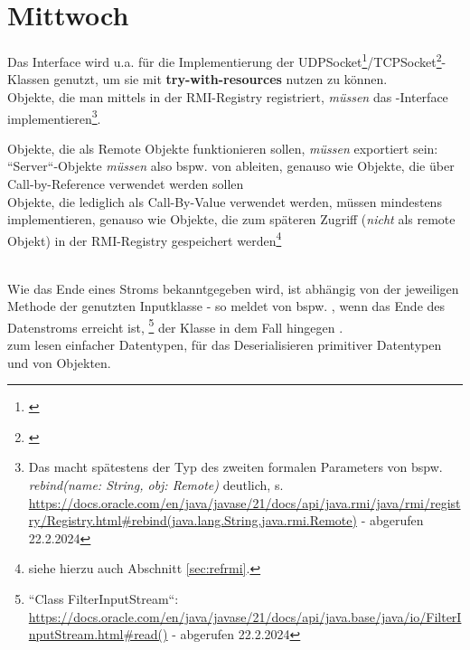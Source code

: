 \section{Mittwoch}

Das Interface  wird u.a. für die Implementierung der UDPSocket\footnote{\cite[269, Listing 5.1]{Oec22}}/TCPSocket\footnote{\cite[286, Listing 5.7]{Oec22}}-Klassen genutzt, um sie mit \textbf{try-with-resources} nutzen zu können.\\

\noindent
Objekte, die man mittels   in der RMI-Registry registriert, \textit{müssen} das -Interface implementieren\footnote{
Das macht spätestens der Typ des zweiten formalen Parameters von bspw. \textit{rebind(name: String, obj: Remote)} deutlich, s. \url{https://docs.oracle.com/en/java/javase/21/docs/api/java.rmi/java/rmi/registry/Registry.html#rebind(java.lang.String,java.rmi.Remote)} - abgerufen 22.2.2024
}.

\begin{tcolorbox}
Objekte, die als Remote Objekte funktionieren sollen, \textit{müssen} exportiert sein: ``Server``-Objekte \textit{müssen} also bspw. von  ableiten, genauso wie Objekte, die über Call-by-Reference verwendet werden sollen\\

    \noindent
    Objekte, die lediglich als Call-By-Value verwendet werden, müssen mindestens  implementieren, genauso wie Objekte, die zum späteren Zugriff (\textit{nicht} als remote Objekt) in der RMI-Registry gespeichert werden\footnote{
        siehe hierzu auch Abschnitt \ref{sec:refrmi}.
}
\end{tcolorbox}\\

\noindent
Wie das Ende eines Stroms bekanntgegeben wird, ist abhängig von der jeweiligen Methode der genutzten Inputklasse - so meldet  von  bspw. , wenn das Ende des Datenstroms erreicht ist, \footnote{
    ``Class FilterInputStream``: \url{https://docs.oracle.com/en/java/javase/21/docs/api/java.base/java/io/FilterInputStream.html#read()} - abgerufen 22.2.2024
} der Klasse  in dem Fall hingegen .\\

\noindent
{} zum lesen einfacher Datentypen,  für das Deserialisieren primitiver Datentypen und von Objekten.\\


